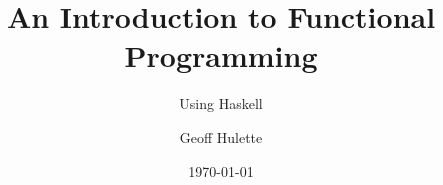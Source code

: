 \documentclass[compress]{beamer}
\title{An Introduction to Functional Programming}
\subtitle{Using Haskell}
\author{Geoff Hulette}
\institute{Sandia National Labs}
\date{\today}
\begin{document}
\begin{frame}[plain]
  \titlepage
\end{frame}









\end{document}
